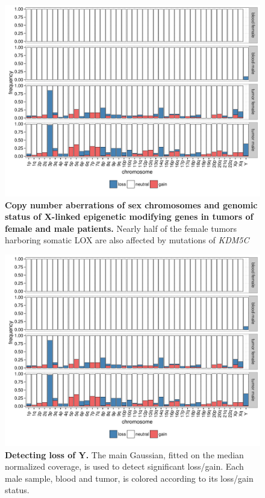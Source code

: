 \begin{figure}[ht]
  \centering
  \includegraphics[width=.7\linewidth, page=5]{figures/Cagekid-LOY-fig.pdf}
  \caption[Copy number aberrations of sex chromosomes
and genomic status of X-linked epigenetic modifying genes in tumors of
female and male patients.]{{\bf Copy number aberrations of sex chromosomes
and genomic status of X-linked epigenetic modifying genes in tumors of
female and male patients.} {\small Nearly half of the female tumors harboring
somatic LOX are also affected by mutations of {\it KDM5C}}}
  \label{fig:loyS4}
\end{figure}


\begin{figure}[ht]
  \centering
  \includegraphics[width=.8\linewidth, page=6]{figures/Cagekid-LOY-fig.pdf}
  \caption[Detecting loss of Y.]{{\bf Detecting loss of Y.} {\small The main Gaussian, fitted on the median normalized coverage, is used to detect significant loss/gain. Each male sample, blood and tumor, is colored according to its loss/gain status.}}
  \label{fig:loyS5}
\end{figure}



